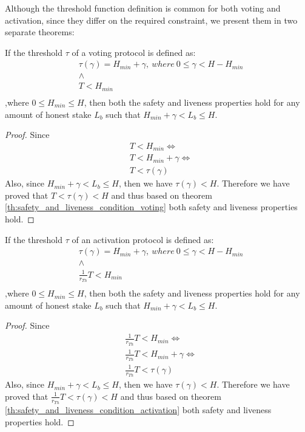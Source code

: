 Although the threshold function definition is common for both voting and 
activation, since they differ on the required constraint, we present them in 
two separate theorems:
\begin{theorem}\label{th:proposed_voting_threshold}
	If the threshold $\tau$ of a voting protocol is 
	defined as:
	\begin{align*}
		&\tau(\gamma) = H_{min} + \gamma,\ where\ 0 \leq \gamma < H-H_{min} \\
		&\land\\
		&T < H_{min}\\
	\end{align*}
,where  $0 \leq H_{min} \leq H$,
then both the safety and liveness properties hold for any amount of honest 
stake $L_b$ such that $H_{min} + \gamma < L_b \leq H$.
	\begin{proof}
		Since 
		\begin{align*}
			&T < H_{min} \iff\\
			&T < H_{min} + \gamma \iff\\
			&T < \tau(\gamma)
		\end{align*}
		Also, since $H_{min} + \gamma < L_b \leq H$, then we have $\tau(\gamma) 
		< H$.
		Therefore we have proved that $T < \tau(\gamma) < H$ and thus 
		based on theorem \ref{th:safety_and_liveness_condition_voting} both 
		safety 
		and 
		liveness properties hold.
	\end{proof}
\end{theorem}

\begin{theorem}\label{th:proposed_adoption_threshold}
	If the threshold $\tau$ of an activation protocol is 
	defined as:
	\begin{align*}
		&\tau(\gamma) = H_{min} + \gamma,\ where\ 0 \leq \gamma < H-H_{min} \\
		&\land\\
		&\frac{1}{r_{Th}}T < H_{min}\\
	\end{align*}
	,where $0 \leq H_{min} \leq H$,
	then both the safety and liveness properties hold for any amount of honest 
	stake $L_b$ such that $H_{min} + \gamma < L_b \leq H$.
	\begin{proof}
		Since 
		\begin{align*}
			&\frac{1}{r_{Th}}T < H_{min} \iff\\
			&\frac{1}{r_{Th}}T < H_{min} + \gamma \iff\\
			&\frac{1}{r_{Th}}T < \tau(\gamma)
		\end{align*}
		Also, since $H_{min} + \gamma < L_b \leq H$, then we have $\tau(\gamma) 
		< H$.
		Therefore we have proved that $\frac{1}{r_{Th}}T < \tau(\gamma) < H$ 
		and thus 
		based on theorem \ref{th:safety_and_liveness_condition_activation} both 
		safety 
		and 
		liveness properties hold.
	\end{proof}
\end{theorem}


